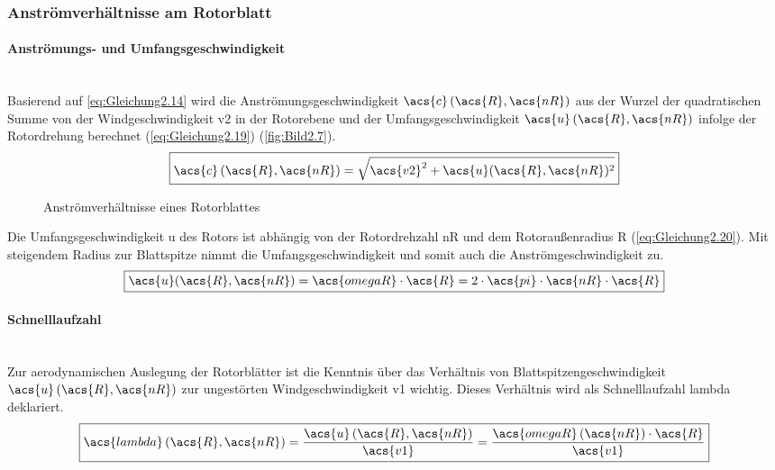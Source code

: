 \subsubsection{Anströmverhältnisse am Rotorblatt}

\paragraph{Anströmungs- und Umfangsgeschwindigkeit}\mbox{}\smallskip\\
Basierend auf \autoref{eq:Gleichung2.14} wird die Anströmungsgeschwindigkeit $\acs{c}\left(\acs{R}, \acs{nR}\right)$ aus der Wurzel der quadratischen Summe von der Windgeschwindigkeit \acs{v2} in der Rotorebene und der Umfangsgeschwindigkeit $\acs{u}\left(\acs{R}, \acs{nR}\right)$ infolge der Rotordrehung berechnet (\autoref{eq:Gleichung2.19}) (\autoref{fig:Bild2.7}).
\begin{equation} \label{eq:Gleichung2.19}
    \boxed{\acs{c}\left(\acs{R}, \acs{nR}\right) = \sqrt{\acs{v2}^2 + \acs{u}(\acs{R}, \acs{nR})^2}}
\end{equation}
\begin{figure}[H]
   \centering
   \caption[Antrömverhältnisse eines Rotorblattes]{Anströmverhältnisse eines Rotorblattes}
   \label{fig:Bild2.7}
\end{figure}

Die Umfangsgeschwindigkeit \acs{u} des Rotors ist abhängig von der Rotordrehzahl \acs{nR} und dem Rotoraußenradius \acs{R} (\autoref{eq:Gleichung2.20}). Mit steigendem Radius zur Blattspitze nimmt die Umfangsgeschwindigkeit und somit auch die Anströmgeschwindigkeit zu.
\begin{equation} \label{eq:Gleichung2.20}
    \boxed{\acs{u}(\acs{R}, \acs{nR}) = \acs{omegaR} \cdot \acs{R} = 2 \cdot \acs{pi} \cdot \acs{nR} \cdot \acs{R}}
\end{equation}

\paragraph{Schnelllaufzahl}\mbox{}\smallskip\\
Zur aerodynamischen Auslegung der Rotorblätter ist die Kenntnis über das Verhältnis von Blattspitzengeschwindigkeit $\acs{u}\left(\acs{R}, \acs{nR}\right)$ zur ungestörten Windgeschwindigkeit \acs{v1} wichtig. Dieses Verhältnis wird als Schnelllaufzahl \acs{lambda} deklariert.
\begin{equation} \label{eq:Gleichung2.21}
    \boxed{\acs{lambda}\left(\acs{R}, \acs{nR}\right) = \frac{\acs{u}\left(\acs{R}, \acs{nR}\right)}{\acs{v1}} = \frac{\acs{omegaR}\left(\acs{nR}\right) \cdot \acs{R}}{\acs{v1}}}
\end{equation}


